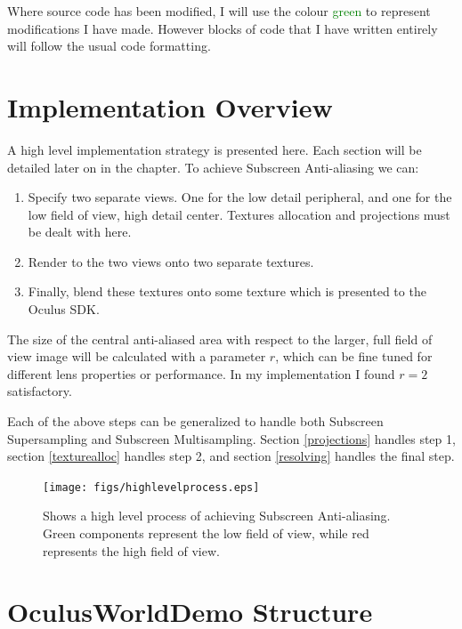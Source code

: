 \documentclass[12pt,a4paper,twoside,openright]{report}
\begin{document}
Where source code has been modified, I will use the colour \textcolor{green}{green} to represent modifications I have made. However blocks of code that I have written entirely will follow the usual code formatting.

\section{Implementation Overview}\label{overview}

A high level implementation strategy is presented here. Each section will be detailed later on in the chapter.
To achieve Subscreen Anti-aliasing we can:

\begin{enumerate}
\item Specify two separate views. One for the low detail peripheral, and one for the low field of view, high detail center. Textures allocation and projections must be dealt with here.
\item Render to the two views onto two separate textures.
\item Finally, blend these textures onto some texture which is presented to the Oculus SDK. 
\end{enumerate}

\noindent The size of the central anti-aliased area with respect to the larger, full field of view image will be calculated with a parameter $r$, which can be fine tuned for different lens properties or performance. In my implementation I found $r = 2$ satisfactory.

Each of the above steps can be generalized to handle both Subscreen Supersampling and Subscreen Multisampling. Section \ref{projections} handles step 1, section \ref{texturealloc} handles step 2, and section \ref{resolving} handles the final step.

\begin{figure}[tbh]
\begin{center}
\texttt{[image: figs/highlevelprocess.eps]}
\caption{Shows a high level process of achieving Subscreen Anti-aliasing. Green components represent the low field of view, while red represents the high field of view.}
\label{fig:highlevelprocess}
\end{center}
\end{figure}

\section{OculusWorldDemo Structure}
\end{document}
